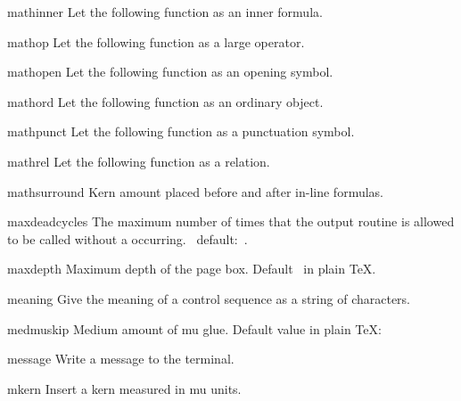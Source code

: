 \item mathinner
      Let the following  function 
      as an inner formula.

\item mathop
      Let the following  function 
      as a large operator.

\item mathopen
      Let the following  function 
      as an opening symbol.

\item mathord
      Let the following  function 
      as an ordinary object.

\item mathpunct
      Let the following  function 
      as a punctuation symbol.

\item mathrel
      Let the following  function as a relation.

\item mathsurround
      Kern amount placed before and after in-line formulas.

\item maxdeadcycles
      The maximum number of times that the output routine is allowed to
      be called without a  occurring.
      \IniTeX\ default:~.

\item maxdepth
      Maximum depth of the page box.
      Default~\n{4pt} in plain \TeX.

\item meaning
      Give the meaning of a control sequence as a string of characters.

\item medmuskip
      Medium amount of mu glue.
      Default value in plain \TeX: 

\item message
      Write a message to the terminal.
      
\item mkern
      Insert a kern measured in mu units.

